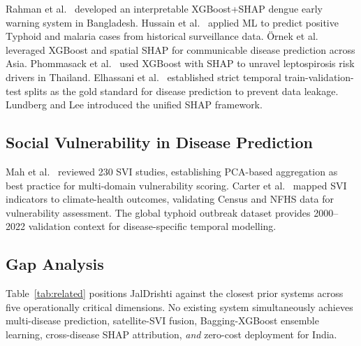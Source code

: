 \documentclass[conference]{IEEEtran}
\begin{document}
Rahman et al.\ \cite{rahman2025} developed an interpretable XGBoost+SHAP
dengue early warning system in Bangladesh. Hussain et al.\
\cite{hussain2023} applied ML to predict positive Typhoid and malaria
cases from historical surveillance data. \"{O}rnek et al.\ \cite{inik2025}
leveraged XGBoost and spatial SHAP for communicable disease prediction
across Asia. Phommasack et al.\ \cite{phommasack2025} used XGBoost with
SHAP to unravel leptospirosis risk drivers in Thailand.
Elhassani et al.\ \cite{elhassani2025} established strict temporal
train-validation-test splits as the gold standard for disease prediction
to prevent data leakage. Lundberg and Lee \cite{lundberg2017} introduced
the unified SHAP framework.

\subsection{Social Vulnerability in Disease Prediction}

Mah et al.\ \cite{mah2023} reviewed 230 SVI studies, establishing
PCA-based aggregation as best practice for multi-domain vulnerability
scoring. Carter et al.\ \cite{carter2023} mapped SVI indicators to
climate-health outcomes, validating Census and NFHS data for vulnerability
assessment. The global typhoid outbreak dataset \cite{typhoid2024}
provides 2000--2022 validation context for disease-specific temporal
modelling.

\subsection{Gap Analysis}

Table~\ref{tab:related} positions JalDrishti against the closest prior
systems across five operationally critical dimensions. No existing system
simultaneously achieves multi-disease prediction, satellite-SVI fusion,
Bagging-XGBoost ensemble learning, cross-disease SHAP attribution,
\emph{and} zero-cost deployment for India.
\end{document}
